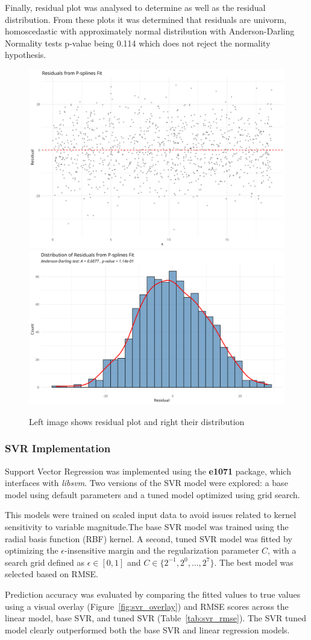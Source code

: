 \documentclass[8pt,twocolumn]{article}
\begin{document}
Finally, residual plot was analysed to determine as well as the residual distribution. From these plots it was determined that
residuals are univorm, homoscedastic with approximately normal distribution with Anderson-Darling Normality tests p-value being 0.114
which does not reject the normality hypothesis.

\begin{figure}[htbp]
    \centering
    \includegraphics[width=0.40\columnwidth]{psplines_residuals.png}
    \includegraphics[width=0.40\columnwidth]{psplines_residual_distribution.png}
    \caption{Left image shows residual plot and right their distribution}
    \label{fig:both_images}
\end{figure}


\subsubsection{SVR Implementation}
Support Vector Regression was implemented using the \textbf{e1071} package, which interfaces with \textit{libsvm}. Two versions of the SVR model were explored: a base model using default parameters and a tuned model optimized using grid search.

This models were trained on scaled input data to avoid issues related to kernel sensitivity to variable magnitude.The base SVR model was trained using the radial basis function (RBF) kernel. A second, tuned SVR model was fitted by optimizing the $\epsilon$-insensitive margin and the regularization parameter $C$, with a search grid defined as $\epsilon \in [0, 1]$ and $C \in \{2^{-1}, 2^0, \dots, 2^7\}$. The best model was selected based on RMSE. 

Prediction accuracy was evaluated by comparing the fitted values to true values using a visual overlay (Figure~\ref{fig:svr_overlay}) and RMSE scores across the linear model, base SVR, and tuned SVR (Table~\ref{tab:svr_rmse}). The SVR tuned model clearly outperformed both the base SVR and linear regression models.
\end{document}
